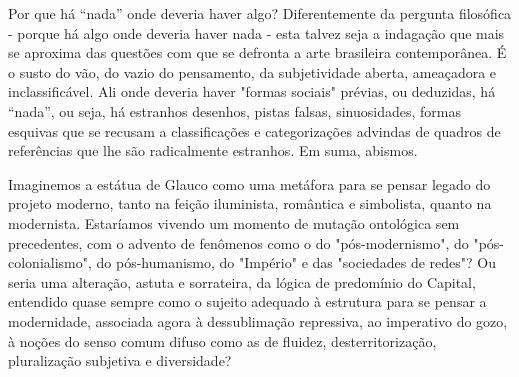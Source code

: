 \begin{multicols}{2}
\noindent{}Por que há ``nada'' onde deveria haver algo? Diferentemente da pergunta
filosófica - porque há algo onde deveria haver nada - esta talvez seja a
indagação que mais se aproxima das questões com que se defronta a arte
brasileira contemporânea. É o susto do vão, do vazio do pensamento, da
subjetividade aberta, ameaçadora e inclassificável. Ali onde deveria
haver "formas sociais" prévias, ou deduzidas, há ``nada'', ou seja, há
estranhos desenhos, pistas falsas, sinuosidades, formas esquivas que se
recusam a classificações e categorizações advindas de quadros de
referências que lhe são radicalmente estranhos. Em suma, abismos.


\vspace{\baselineskip}
{\small{}}
\vspace{\baselineskip}

Imaginemos a estátua de Glauco como uma metáfora para se pensar legado
do projeto moderno, tanto na feição iluminista, romântica e simbolista,
quanto na modernista. Estaríamos vivendo um momento de mutação
ontológica sem precedentes, com o advento de fenômenos como o do
"pós-modernismo", do "pós-colonialismo", do pós-humanismo, do "Império"
e das "sociedades de redes"? Ou seria uma alteração, astuta e
sorrateira, da lógica de predomínio do Capital, entendido quase sempre
como o sujeito adequado à estrutura para se pensar a modernidade,
associada agora à dessublimação repressiva, ao imperativo do gozo, à
noções do senso comum difuso como as de fluidez, desterritorização,
pluralização subjetiva e diversidade?


\end{multicols}
